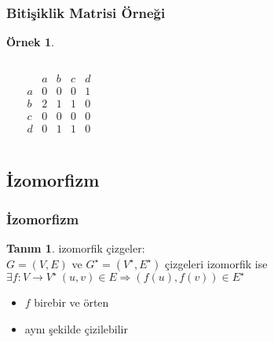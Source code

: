 \documentclass[dvipsnames]{beamer}
\theoremstyle{definition}
\newtheorem{tanim}[theorem]{Tanım}
\theoremstyle{example}
\newtheorem{ornek}[theorem]{Örnek}
\theoremstyle{plain}
\begin{document}
\begin{frame}
  \frametitle{Bitişiklik Matrisi Örneği}

  \begin{ornek}
    \begin{columns}
    \begin{center}
    \end{center}

      \[
        \begin{array}{c|cccc}
              & a & b & c & d\\\hline
            a & 0 & 0 & 0 & 1\\
            b & 2 & 1 & 1 & 0\\
            c & 0 & 0 & 0 & 0\\
            d & 0 & 1 & 1 & 0
        \end{array}
      \]
    \end{columns}
  \end{ornek}
\end{frame}

\subsection{İzomorfizm}

\begin{frame}
  \frametitle{İzomorfizm}

  \begin{tanim}
    \alert{izomorfik çizgeler}:\\
    $G=(V,E)$ ve $G^\star=(V^\star,E^\star)$ çizgeleri izomorfik ise\\
    $\exists f: V \rightarrow V^\star~(u,v) \in E \Rightarrow (f(u),f(v)) \in E^\star$

    \begin{itemize}
      \item $f$ birebir ve örten
    \end{itemize}
  \end{tanim}

  \pause
  \begin{itemize}
    \item aynı şekilde çizilebilir
  \end{itemize}
\end{frame}
\end{document}

